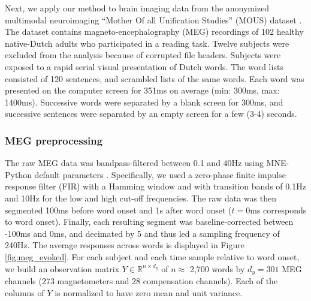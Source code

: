 
Next, we apply our method to brain imaging data from the anonymized multimodal
neuroimaging ``Mother Of all Unification Studies'' (MOUS) dataset
\citep{schoffelen2019204}. The dataset contains magneto-encephalography (MEG)
recordings of 102 healthy native-Dutch adults who participated in a reading
task. Twelve subjects were excluded from the analysis because of corrupted file headers.
%
Subjects were exposed to a rapid serial visual presentation of Dutch words. The
word lists consisted of 120 sentences, and scrambled lists of the same words.
Each word was presented on the computer screen for 351ms on average (min: 300ms,
max: 1400ms). Successive words were separated by a blank screen for 300ms, and
successive sentences were separated by an empty screen for a few (3-4) seconds.

\subsubsection{MEG preprocessing}

The raw MEG data was bandpass-filtered between 0.1 and 40Hz using MNE-Python
default parameters \citep{gramfort2013meg, gramfort2014mne}. Specifically, we
used a zero-phase finite impulse
response filter (FIR) with a Hamming window and with transition bands of 0.1Hz
and 10Hz for the low and high cut-off frequencies. The raw data was then
segmented 100ms before word onset and 1s after
word onset ($t=0$ms corresponds to word onset). Finally, each resulting
segment was baseline-corrected between -100ms and 0ms, and decimated by 5 and
thus led a sampling frequency of 240Hz. The average responses across words is
displayed in Figure \ref{fig:meg_evoked}.
For each subject and each time sample relative to word onset, we
build an observation matrix $Y \in \mathbb{R}^{n \times d_y}$ of $n\approx$ 2,700 words
by $d_y=301$ MEG channels (273 magnetometers and 28 compensation channels). Each
of the columns of $Y$ is normalized to have zero mean and unit variance.

